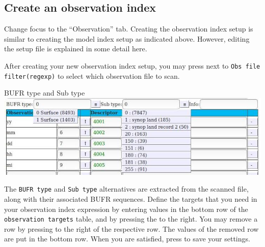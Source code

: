 \documentclass[letterpaper,10pt,twoside,twocolumn,openany]{book}
\begin{document}
{\subsection{Create an observation index}
Change focus to the ``Observation'' tab. 
Creating the observation index setup is similar to creating the model index setup as indicated above.
However, editing the setup file is explained in some detail here.

After creating your new observation index setup, 
you may press  next to
\lstinline!Obs file filter(regexp)! to select which observation file to scan.
\begin{paperbox}{BUFR type and Sub type}
  \includegraphics[width=\columnwidth]{how_obs.jpg}
\end{paperbox}
The \lstinline!BUFR type! and \lstinline!Sub type! alternatives are extracted from the scanned file,
along with their associated BUFR sequences.
Define the targets that you need in your observation index expression by entering values
in the bottom row of the \lstinline!observation targets! table, and by pressing the  to the right.
You may remove a row by pressing   to the right of the respective row.
The values of the removed row are put in the bottom row.
When you are satisfied, press  to save your settings.

}
\end{document}
